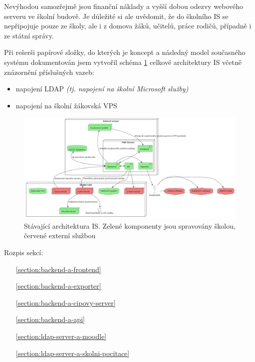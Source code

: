 \documentclass[FM,Proj]{tulthesis}
\begin{document}
Nevýhodou samozřejmě jsou finanční náklady a vyšší dobou odezvy webového serveru 
ve školní budově. Je důležité si ale uvědomit, že do školního IS se nepřipojuje 
pouze ze školy, ale i z domova žáků, učitelů, práce rodičů, případně i ze státní správy.  

Při rešerši papírové složky, do kterých je koncept a následný model současného systému dokumentován
jsem vytvořil schéma \ref{fig:puvodni-architektura} celkové architektury IS včetně znázornění 
příslušných vazeb:
\begin{itemize}
    \item napojení LDAP \textit{(tj. napojení na školní Microsoft služby)}
    \item napojení na školní žákovská VPS
\end{itemize}

\begin{landscape}
    \begin{figure}[H]
        \includegraphics[width=\linewidth]{architektura-puvodni.png}
        \caption{Stávající architektura IS. Zelené komponenty jsou
        spravovány školou, červené externí službou}
        \label{fig:puvodni-architektura}
    \end{figure}
\end{landscape}

Rozpis sekcí:
\begin{enumerate}
    \item[\ref{section:backend-a-frontend}] 
    \item[\ref{section:backend-a-exporter}] 
    \item[\ref{section:backend-a-cipovy-server}] 
    \item[\ref{section:backend-a-api}] 
    \item[\ref{section:ldap-server-a-moodle}] 
    \item[\ref{section:ldap-server-a-skolni-pocitace}] 
\end{enumerate}
\end{document}
